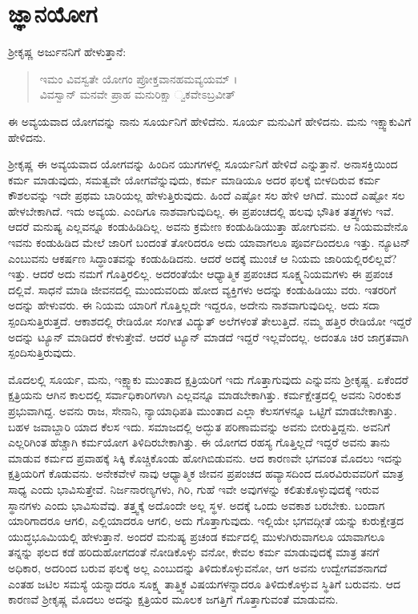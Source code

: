 
\chapter{ಜ್ಞಾನಯೋಗ}

ಶ್ರೀಕೃಷ್ಣ ಅರ್ಜುನನಿಗೆ ಹೇಳುತ್ತಾನೆ:

\begin{verse}
ಇಮಂ ವಿವಸ್ವತೇ ಯೋಗಂ ಪ್ರೋಕ್ತವಾನಹಮವ್ಯಯಮ್ ।\\ವಿವಸ್ವಾನ್ ಮನವೇ ಪ್ರಾಹ ಮನುರಿಕ್ಷಾ ್ವಕವೇಽಬ್ರವೀತ್ 
\end{verse}

{\small ಈ ಅವ್ಯಯವಾದ ಯೋಗವನ್ನು ನಾನು ಸೂರ್ಯನಿಗೆ ಹೇಳಿದೆನು. ಸೂರ್ಯ ಮನುವಿಗೆ ಹೇಳಿದನು. ಮನು ಇಕ್ಷ್ವಾಕುವಿಗೆ ಹೇಳಿದನು.}

ಶ್ರೀಕೃಷ್ಣ ಈ ಅವ್ಯಯವಾದ ಯೋಗವನ್ನು ಹಿಂದಿನ ಯುಗಗಳಲ್ಲಿ ಸೂರ್ಯನಿಗೆ ಹೇಳಿದೆ ಎನ್ನುತ್ತಾನೆ. ಅನಾಸಕ್ತಿಯಿಂದ ಕರ್ಮ ಮಾಡುವುದು, ಸಮತ್ವವೇ ಯೋಗವೆನ್ನುವುದು, ಕರ್ಮ ಮಾಡಿಯೂ ಅದರ ಫಲಕ್ಕೆ ಬೀಳದಿರುವ ಕರ್ಮ ಕೌಶಲವನ್ನು ಇದೇ ಪ್ರಥಮ ಬಾರಿಯಲ್ಲ ಹೇಳುತ್ತಿರುವುದು. ಹಿಂದೆ ಎಷ್ಟೋ ಸಲ ಹೇಳಿ ಆಗಿದೆ. ಮುಂದೆ ಎಷ್ಟೋ ಸಲ ಹೇಳಬೇಕಾಗಿದೆ. ಇದು ಅವ್ಯಯ. ಎಂದಿಗೂ ನಾಶವಾಗುವುದಿಲ್ಲ. ಈ ಪ್ರಪಂಚದಲ್ಲಿ ಹಲವು ಭೌತಿಕ ತತ್ತ್ವಗಳು ಇವೆ. ಆದರೆ ಮನುಷ್ಯ ಎಲ್ಲವನ್ನೂ ಕಂಡುಹಿಡಿದಿಲ್ಲ. ಅವನು ಕ್ರಮೇಣ ಕಂಡುಹಿಡಿಯುತ್ತಾ ಹೋಗುವನು. ಆ ನಿಯಮವೇನೊ ಇವನು ಕಂಡುಹಿಡಿದ ಮೇಲೆ ಜಾರಿಗೆ ಬಂದಂತೆ ತೋರಿದರೂ ಅದು ಯಾವಾಗಲೂ ಪೂರ್ವದಿಂದಲೂ ಇತ್ತು. ನ್ಯೂಟನ್ ಎಂಬುವನು ಆಕರ್ಷಣ ಸಿದ್ಧಾಂತವನ್ನು ಕಂಡುಹಿಡಿದನು. ಆದರೆ ಅದಕ್ಕೆ ಮುಂಚೆ ಆ ನಿಯಮ ಜಾರಿಯಲ್ಲಿರಲಿಲ್ಲವೆ? ಇತ್ತು. ಆದರೆ ಅದು ನಮಗೆ ಗೊತ್ತಿರಲಿಲ್ಲ. ಅದರಂತೆಯೇ ಆಧ್ಯಾತ್ಮಿಕ ಪ್ರಪಂಚದ ಸೂಕ್ಷ್ಮನಿಯಮಗಳು ಈ ಪ್ರಪಂಚ ದಲ್ಲಿವೆ. ಸಾಧನೆ ಮಾಡಿ ಜೀವನದಲ್ಲಿ ಮುಂದುವರಿದು ಹೋದ ವ್ಯಕ್ತಿಗಳು ಅದನ್ನು ಕಂಡುಹಿಡಿಯು ವರು. ಇತರರಿಗೆ ಅದನ್ನು ಹೇಳುವರು. ಈ ನಿಯಮ ಯಾರಿಗೆ ಗೊತ್ತಿಲ್ಲದೇ ಇದ್ದರೂ, ಅದೇನು ನಾಶವಾಗುವುದಿಲ್ಲ. ಅದು ಸದಾ ಸ್ಪಂದಿಸುತ್ತಿರುತ್ತದೆ. ಆಕಾಶದಲ್ಲಿ ರೇಡಿಯೋ ಸಂಗೀತ ವಿದ್ಯುತ್ ಅಲೆಗಳಂತೆ ತೇಲುತ್ತಿದೆ. ನಮ್ಮ ಹತ್ತಿರ ರೇಡಿಯೋ ಇದ್ದರೆ ಅದನ್ನು ಟ್ಯೂನ್ ಮಾಡಿದರೆ ಕೇಳುತ್ತೇವೆ. ಆದರೆ ಟ್ಯೂನ್ ಮಾಡದೆ ಇದ್ದರೆ ಇಲ್ಲವೆಂದಲ್ಲ. ಅದಂತೂ ಚಿರ ಜಾಗ್ರತವಾಗಿ ಸ್ಪಂದಿಸುತ್ತಿರುವುದು.

ಮೊದಲಲ್ಲಿ ಸೂರ್ಯ, ಮನು, ಇಕ್ಷ್ವಾಕು ಮುಂತಾದ ಕ್ಷತ್ರಿಯರಿಗೆ ಇದು ಗೊತ್ತಾಗುವುದು ಎನ್ನುವನು ಶ್ರೀಕೃಷ್ಣ. ಏಕೆಂದರೆ ಕ್ಷತ್ರಿಯನು ಆಗಿನ ಕಾಲದಲ್ಲಿ ಸರ್ವಾಧಿಕಾರಿಗಳಾಗಿ ಎಲ್ಲವನ್ನೂ ಮಾಡಬೇಕಾಗಿತ್ತು. ಕರ್ಮಕ್ಷೇತ್ರದಲ್ಲಿ ಅವನು ನಿರಂಕುಶ ಪ್ರಭುವಾಗಿದ್ದ. ಅವನು ರಾಜ, ಸೇನಾನಿ, ನ್ಯಾಯಾಧಿಪತಿ ಮುಂತಾದ ಎಲ್ಲಾ ಕೆಲಸಗಳನ್ನೂ ಒಟ್ಟಿಗೆ ಮಾಡಬೇಕಾಗಿತ್ತು. ಬಹಳ ಜವಾಬ್ದಾರಿ ಯಾದ ಕೆಲಸ ಇದು. ಸಮಾಜದಲ್ಲಿ ಅದ್ಭುತ ಪರಿಣಾಮವನ್ನು ಅವನು ಬೀರುತ್ತಿದ್ದನು. ಅವನಿಗೆ ಎಲ್ಲರಿಗಿಂತ ಹೆಚ್ಚಾಗಿ ಕರ್ಮಯೋಗ ತಿಳಿದಿರಬೇಕಾಗಿತ್ತು. ಈ ಯೋಗದ ರಹಸ್ಯ ಗೊತ್ತಿಲ್ಲದೆ ಇದ್ದರೆ ಅವನು ತಾನು ಮಾಡುವ ಕರ್ಮದ ಪ್ರವಾಹಕ್ಕೆ ಸಿಕ್ಕಿ ಕೊಚ್ಚಿಕೊಂಡು ಹೋಗಿಬಿಡುವನು. ಆದ ಕಾರಣವೇ ಭಗವಂತ ಮೊದಲು ಇದನ್ನು ಕ್ಷತ್ರಿಯರಿಗೆ ಕೊಡುವನು. ಅನೇಕವೇಳೆ ನಾವು ಆಧ್ಯಾತ್ಮಿಕ ಜೀವನ ಪ್ರಪಂಚದ ಹವ್ಯಾಸದಿಂದ ದೂರವಿರುವವರಿಗೆ ಮಾತ್ರ ಸಾಧ್ಯ ಎಂದು ಭಾವಿಸುತ್ತೇವೆ. ನಿರ್ಜನಾರಣ್ಯಗಳು, ಗಿರಿ, ಗುಹೆ ಇವೇ ಅವುಗಳನ್ನು ಕಲಿತುಕೊಳ್ಳುವುದಕ್ಕೆ ಇರುವ ಸ್ಥಾನಗಳು ಎಂದು ಭಾವಿಸುವೆವು. ತತ್ತ್ವಕ್ಕೆ ಅದೊಂದೇ ಅಲ್ಲ ಸ್ಥಳ. ಅದಕ್ಕೆ ಒಂದು ಅವಕಾಶ ಬರಬೇಕು. ಬಂದಾಗ ಯಾರಿಗಾದರೂ ಆಗಲಿ, ಎಲ್ಲಿಯಾದರೂ ಆಗಲಿ, ಅದು ಗೊತ್ತಾಗುವುದು. ಇಲ್ಲಿಯೇ ಭಗವದ್ಗೀತೆ ಯನ್ನು ಕುರುಕ್ಷೇತ್ರದ ಯುದ್ಧಭೂಮಿಯಲ್ಲಿ ಹೇಳುತ್ತಾನೆ. ಅಂದರೆ ಮನುಷ್ಯ ಪ್ರಚಂಡ ಕರ್ಮದಲ್ಲಿ ಮುಳುಗಿರುವಾಗಲೂ ಯಾವಾಗಲೂ ತನ್ನನ್ನು ಫಲದ ಕಡೆ ಹರಿದುಹೋಗದಂತೆ ನೋಡಿಕೊಳ್ಳು ವನೋ, ಕೇವಲ ಕರ್ಮ ಮಾಡುವುದಕ್ಕೆ ಮಾತ್ರ ತನಗೆ ಅಧಿಕಾರ, ಅದರಿಂದ ಬರುವ ಫಲಕ್ಕೆ ಅಲ್ಲ ಎಂಬುದನ್ನು ತಿಳಿದುಕೊಳ್ಳುವನೋ, ಆಗ ಅವನು ಉದ್ವೇಗವಶನಾಗದೆ ಎಂತಹ ಜಟಿಲ ಸಮಸ್ಯೆ ಯನ್ನಾದರೂ ಸೂಕ್ಷ್ಮ ತಾತ್ತ್ವಿಕ ವಿಷಯಗಳನ್ನಾದರೂ ತಿಳಿದುಕೊಳ್ಳುವ ಸ್ಥಿತಿಗೆ ಬರುವನು. ಆದ ಕಾರಣವೆ ಶ್ರೀಕೃಷ್ಣ ಮೊದಲು ಅದನ್ನು ಕ್ಷತ್ರಿಯರ ಮೂಲಕ ಜಗತ್ತಿಗೆ ಗೊತ್ತಾಗುವಂತೆ ಮಾಡುವನು.

